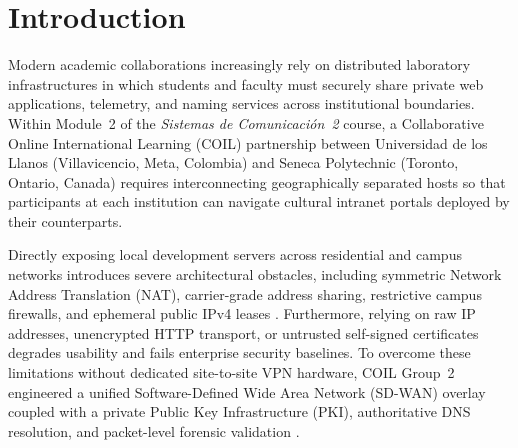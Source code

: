 \section{Introduction}
\label{sec:introduction}

Modern academic collaborations increasingly rely on distributed laboratory infrastructures in which students and faculty must securely share private web applications, telemetry, and naming services across institutional boundaries. Within Module~2 of the \textit{Sistemas de Comunicaci\'{o}n~2} course, a Collaborative Online International Learning (COIL) partnership between Universidad de los Llanos (Villavicencio, Meta, Colombia) and Seneca Polytechnic (Toronto, Ontario, Canada) requires interconnecting geographically separated hosts so that participants at each institution can navigate cultural intranet portals deployed by their counterparts.

Directly exposing local development servers across residential and campus networks introduces severe architectural obstacles, including symmetric Network Address Translation (NAT), carrier-grade address sharing, restrictive campus firewalls, and ephemeral public IPv4 leases \cite{tanenbaum2021,kurose2017}. Furthermore, relying on raw IP addresses, unencrypted HTTP transport, or untrusted self-signed certificates degrades usability and fails enterprise security baselines. To overcome these limitations without dedicated site-to-site VPN hardware, COIL Group~2 engineered a unified Software-Defined Wide Area Network (SD-WAN) overlay coupled with a private Public Key Infrastructure (PKI), authoritative DNS resolution, and packet-level forensic validation \cite{zerotier2024}.

